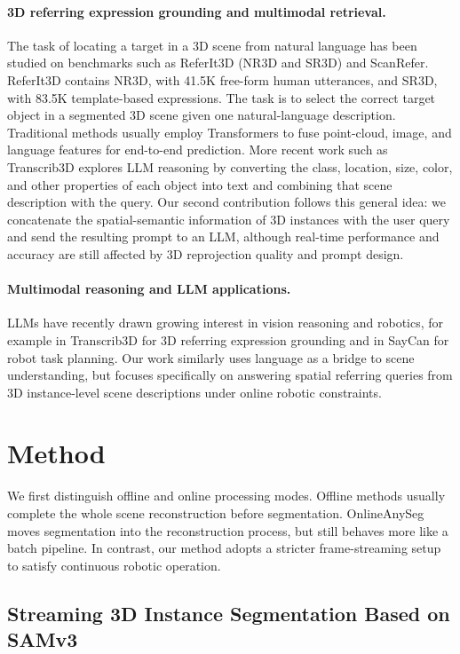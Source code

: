 \documentclass[12pt,a4paper]{article}
\begin{document}
\paragraph{3D referring expression grounding and multimodal retrieval.}
The task of locating a target in a 3D scene from natural language has been studied on benchmarks such as ReferIt3D (NR3D and SR3D) and ScanRefer. ReferIt3D contains NR3D, with 41.5K free-form human utterances, and SR3D, with 83.5K template-based expressions. The task is to select the correct target object in a segmented 3D scene given one natural-language description. Traditional methods usually employ Transformers to fuse point-cloud, image, and language features for end-to-end prediction. More recent work such as Transcrib3D explores LLM reasoning by converting the class, location, size, color, and other properties of each object into text and combining that scene description with the query. Our second contribution follows this general idea: we concatenate the spatial-semantic information of 3D instances with the user query and send the resulting prompt to an LLM, although real-time performance and accuracy are still affected by 3D reprojection quality and prompt design.

\paragraph{Multimodal reasoning and LLM applications.}
LLMs have recently drawn growing interest in vision reasoning and robotics, for example in Transcrib3D for 3D referring expression grounding and in SayCan for robot task planning. Our work similarly uses language as a bridge to scene understanding, but focuses specifically on answering spatial referring queries from 3D instance-level scene descriptions under online robotic constraints.

\section{Method}

We first distinguish offline and online processing modes. Offline methods usually complete the whole scene reconstruction before segmentation. OnlineAnySeg moves segmentation into the reconstruction process, but still behaves more like a batch pipeline. In contrast, our method adopts a stricter frame-streaming setup to satisfy continuous robotic operation.

\subsection{Streaming 3D Instance Segmentation Based on SAMv3}
\end{document}
